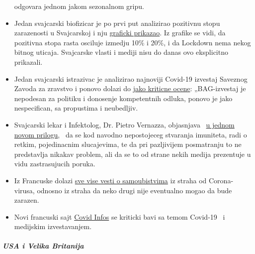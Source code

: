 \begin{itemize}
  odgovara jednom jakom sezonalnom gripu.
\item
  Jedan svajcarski biofizicar je po prvi put analizirao pozitivnu stopu
  zarazenosti u Svajcarskoj i nju
  \href{https://mail.protonmail.com/\#SARSCoV2}{graficki prikazao}. Iz
  grafike se vidi, da pozitivna stopa rasta osciluje izmedju 10\% i
  20\%, i da Lockdown nema nekog bitnog uticaja. Svajcarske vlasti i
  mediji nisu do danas ovo eksplicitno prikazali.
\item
  Jedan svajcarski istrazivac je analizirao najnoviji Covid-19 izvestaj
  Saveznog Zavoda za zravstvo i ponovo dolazi do
  \href{https://covid-19-fakten.blogspot.com/2020/04/der-bag-situationsbericht-vom-1442020.html}{jako
  kriticne ocene}: „BAG-izvestaj je nepodesan za politiku i donosenje
  kompetentnih odluka, ponovo je jako nespecifican, sa propustima i
  neubedljiv.
\item
  Svajcarski lekar i Infektolog, Dr. Pietro Vernazza, objasnjava
  ~\href{https://infekt.ch/2020/04/hinterlaesst-coronavirus-eine-immunitaet/}{u
  jednom novom prilogu}, ~da se kod navodno nepostojeceg stvaranja
  imuniteta, radi o retkim, pojedinacnim slucajevima, te da pri
  pazljivijem posmatranju to ne predstavlja nikakav problem, ali da se
  to od strane nekih medija prezentuje u vidu zastrasujucih poruka.
\item
  Iz Francuske dolazi
  \href{https://www.midilibre.fr/2020/04/09/coronavirus-ces-suicides-de-malades-ou-de-personnes-tenaillees-par-langoisse,8839373.php}{sve
  vise vesti o samoubistvima} iz straha od Corona-virusa, odnosno iz
  straha da neko drugi nije eventualno mogao da bude zarazen.
\item
  Novi francuski sajt \href{https://covidinfos.net/}{Covid Infos} se
  kriticki bavi sa temom Covid-19 ~i medijskim izvestavanjem.
\end{itemize}

\hypertarget{usa-i-velika-britanija}{%
\subparagraph{\texorpdfstring{\textbf{USA i Velika
Britanija}}{USA i Velika Britanija}}\label{usa-i-velika-britanija}}

